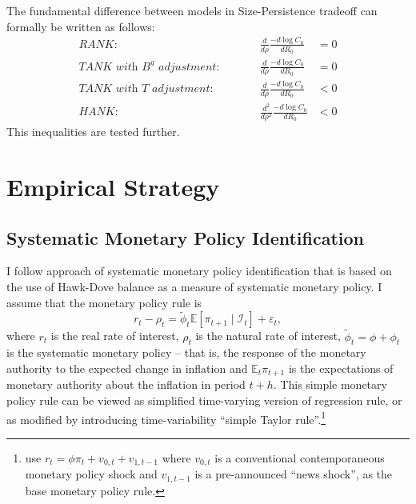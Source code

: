 \documentclass[12pt]{article}
\numberwithin{equation}{section}
\begin{document}
The fundamental difference between models in Size-Persistence tradeoff can formally be written as follows:
\begin{align}
    \textit{RANK:}&\qquad& \frac{d}{d\rho}\frac{-d\log C_0}{dR_0}&=0     \label{eq:SizePersistenceRANK}\\
\textit{TANK with $B^g$ adjustment:}&\qquad& \frac{d}{d\rho}\frac{-d\log C_0}{dR_0}&= 0     \label{eq:SizePersistenceTANK_B}\\
\textit{TANK with $T$ adjustment:}&\qquad& \frac{d}{d\rho}\frac{-d\log C_0}{dR_0}&< 0     \label{eq:SizePersistenceTANK_B}\\
\textit{HANK:}& \qquad& 
    \frac{d^2}{d\rho^2}\frac{-d\log C_0}{dR_0}&<0
    \label{eq:SizePersistenceHANK}
\end{align}
This inequalities are tested further.


\section{Empirical Strategy}
\subsection{Systematic Monetary Policy Identification}

I follow \citet{HIM2023} approach of systematic monetary policy identification that is based on the use of Hawk-Dove balance as a measure of systematic monetary policy. 
I assume that the monetary policy rule is 
\[r_t-\rho_t=\tilde\phi_t\mathbb{E}\left[\pi_{t+1}\mid \mathcal{I}_t\right]+\varepsilon_t,\]
where $r_t$ is the real rate of interest, $\rho_t$ is the natural rate of interest, $\tilde \phi_t=\phi+\phi_t$ is the systematic monetary policy -- that is, the response of the monetary authority to the expected change in inflation and $\mathbb{E}_t\pi_{t+1}$ is the expectations of monetary authority about the inflation in period $t+h$. 
This simple monetary policy rule can be viewed as simplified time-varying version of \citet{RomerRomer2004} regression rule, or as modified by introducing time-variability \citet{McKayWolf2023} ``simple Taylor rule''.\footnote{\citet{McKayWolf2023} use $r_t=\phi\pi_t+v_{0,t}+v_{1,t-1}$ where $v_{0,t}$ is a conventional contemporaneous monetary policy shock and $v_{1,t-1}$ is a pre-announced ``news shock'', as the base monetary policy rule.} 
\end{document}
